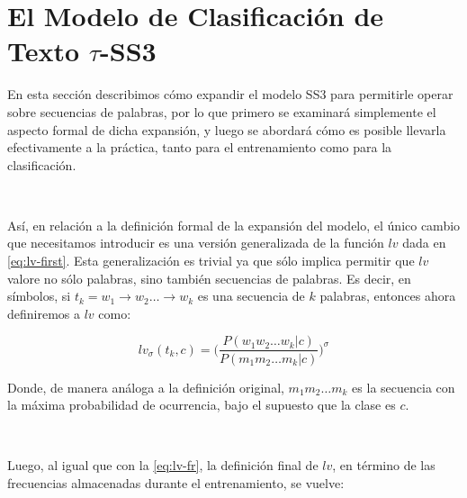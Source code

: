 \section{El Modelo de Clasificación de Texto \texorpdfstring{$\tau$}{t}-SS3}
\label{sec:tss3}

En esta sección describimos cómo expandir el modelo SS3 para permitirle operar sobre secuencias de palabras, por lo que primero se examinará simplemente el aspecto formal de dicha expansión, y luego se abordará cómo es posible llevarla  efectivamente a la práctica, tanto para el entrenamiento como para la clasificación.

\

Así, en relación a la definición formal de la expansión del modelo, el único cambio que necesitamos introducir es una versión generalizada de la función $lv$ dada en \autoref{eq:lv-first}. Esta generalización es trivial ya que sólo implica permitir que $lv$ valore no sólo palabras, sino también secuencias de palabras.
Es decir, en símbolos, si $t_k = w_1 {\rightarrow} w_2 \dots {\rightarrow} w_k$ es una secuencia de $k$ palabras, entonces ahora definiremos a $lv$ como:

\begin{equation}
\label{eq:t-lv-p}
lv_\sigma(t_k, c) = \bigg(\frac{P(w_1w_2\dots w_k|c)}{P(m_1m_2\dots m_k|c)}\bigg)^\sigma
\end{equation}

\vspace{5mm}

Donde, de manera análoga a la definición original, $m_1m_2\dots m_k$ es la secuencia con la máxima probabilidad de ocurrencia, bajo el supuesto que la clase es $c$.

\

Luego, al igual que con la \autoref{eq:lv-fr}, la definición final de $lv$, en término de las frecuencias almacenadas durante el entrenamiento, se vuelve:

